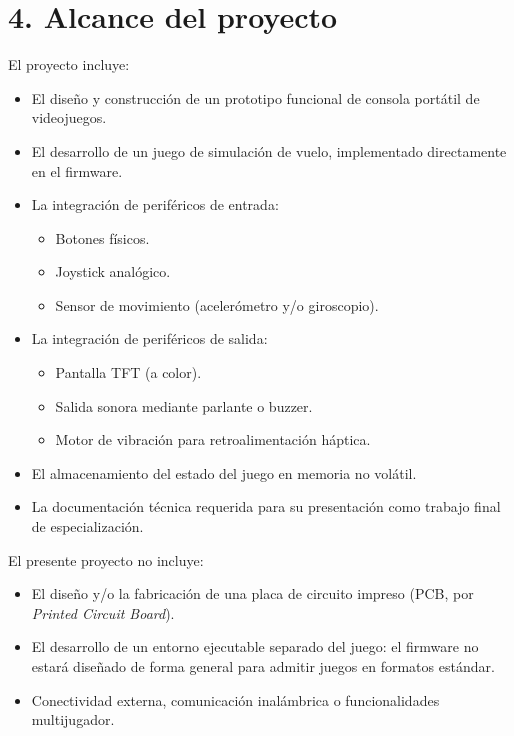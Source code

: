 \documentclass[
11pt, %
]{charter}
\begin{document}
\section{4. Alcance del proyecto}
\label{sec:alcance}




El proyecto incluye:
\begin{itemize}
	\item El diseño y construcción de un prototipo funcional de consola portátil de videojuegos.
	\item El desarrollo de un juego de simulación de vuelo, implementado directamente en el firmware.
	\item La integración de periféricos de entrada:
		\begin{itemize}
		\item Botones físicos.
		\item Joystick analógico.
		\item Sensor de movimiento (acelerómetro y/o giroscopio).
		\end{itemize}
	\item La integración de periféricos de salida:
		\begin{itemize}
		\item Pantalla TFT (a color).
		\item Salida sonora mediante parlante o buzzer.
		\item Motor de vibración para retroalimentación háptica.
		\end{itemize}
	\item El almacenamiento del estado del juego en memoria no volátil.
	\item La documentación técnica requerida para su presentación como trabajo final de especialización.
\end{itemize}
El presente proyecto no incluye:
\begin{itemize}
	\item El diseño y/o la fabricación de una placa de circuito impreso (PCB, por \textit{Printed Circuit Board}).
	\item El desarrollo de un entorno ejecutable separado del juego: el firmware no estará diseñado de forma general para admitir juegos en formatos estándar.
	\item Conectividad externa, comunicación inalámbrica o funcionalidades multijugador.
\end{itemize}
\end{document}
